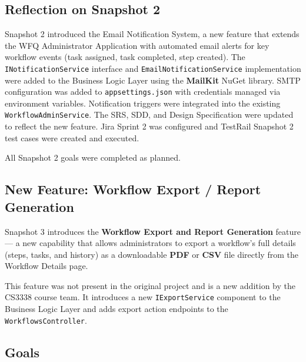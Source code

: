\documentclass[12pt]{article}
\begin{document}
\subsection{Reflection on Snapshot 2}
Snapshot 2 introduced the Email Notification System, a new feature that extends the WFQ
Administrator Application with automated email alerts for key workflow events (task assigned,
task completed, step created). The \texttt{INotificationService} interface and
\texttt{EmailNotificationService} implementation were added to the Business Logic Layer using
the \textbf{MailKit} NuGet library. SMTP configuration was added to
\texttt{appsettings.json} with credentials managed via environment variables. Notification
triggers were integrated into the existing \texttt{WorkflowAdminService}. The SRS, SDD, and
Design Specification were updated to reflect the new feature. Jira Sprint 2 was configured
and TestRail Snapshot 2 test cases were created and executed.

All Snapshot 2 goals were completed as planned.

\subsection{New Feature: Workflow Export / Report Generation}
Snapshot 3 introduces the \textbf{Workflow Export and Report Generation} feature --- a new
capability that allows administrators to export a workflow's full details (steps, tasks, and
history) as a downloadable \textbf{PDF} or \textbf{CSV} file directly from the Workflow
Details page.

This feature was not present in the original project and is a new addition by the CS3338
course team. It introduces a new \texttt{IExportService} component to the Business Logic
Layer and adds export action endpoints to the \texttt{WorkflowsController}.

\subsection{Goals}
\end{document}
